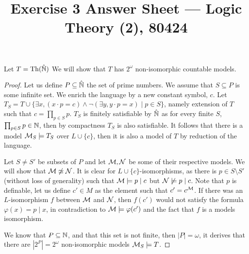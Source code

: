 
\title{Exercise 3 Answer Sheet --- Logic Theory (2), 80424}


\maketitle
\maketitleprint{}

\question{}
Let $T = \operatorname{Th}(\hat{\mathbb{N}})$
We will show that $T$ has $2^\omega$ non-isomorphic countable models.
\begin{proof}
	Let us define $P \subseteq \hat{\mathbb{N}}$ the set of prime numbers.
	We assume that $S \subseteq P$ is some infinite set.
	We enrich the language by a new constant symbol, $c$.
	Let $T_S = T \cup \{ \exists x, (x \cdot p = c) \land \lnot (\exists y, y \cdot p = x) \mid p \in S \}$, namely extension of $T$ such that $c = \prod_{p \in S} p$.
	$T_S$ is finitely satisfiable by $\hat{\mathbb{N}}$ as for every finite $S$, $\prod_{p \in S} p \in \mathbb{N}$, then by compactness $T_S$ is also satisfiable.
	It follows that there is a model $\mathcal{M}_S \models T_S$ over $L \cup \{ c \}$, then it is also a model of $T$ by reduction of the language.
	
	Let $S \ne S'$ be subsets of $P$ and let $\mathcal{M}, \mathcal{N}$ be some of their respective models.
	We will show that $\mathcal{M} \not\simeq \mathcal{N}$.
	It is clear for $L \cup \{ c \}$-isomorphisms, as there is $p \in S \setminus S'$ (without loss of generality) such that $\mathcal{M} \models p \mid c$ but $\mathcal{N} \not\models p \mid c$.
	Note that $p$ is definable, let us define $c' \in M$ as the element such that $c' = c^{\mathcal{M}}$.
	If there was an $L$-isomorphism $f$ between $\mathcal{M}$ and $\mathcal{N}$, then $f(c')$ would not satisfy the formula $\varphi(x) = p \mid x$, in contradiction to $\mathcal{M} \models \varphi(c')$ and the fact that $f$ is a models isomorphism.

	We know that $P \subseteq \mathbb{N}$, and that this set is not finite, then $|P| = \omega$, it derives that there are $|2^P| = 2^\omega$ non-isomorphic models $\mathcal{M}_S \models T$.
\end{proof}

